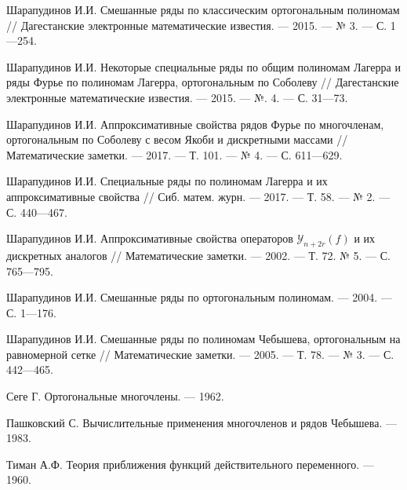 \begin{thebibliography}{99}
Шарапудинов И.И. Смешанные ряды по классическим ортогональным полиномам // Дагестанские электронные математические известия. --- 2015. --- № 3. --- С. 1---254.





Шарапудинов И.И. Некоторые специальные ряды по общим полиномам Лагерра и ряды Фурье по полиномам Лагерра, ортогональным по Соболеву // Дагестанские электронные математические известия. --- 2015. --- №. 4. --- С. 31---73.





Шарапудинов И.И. Аппроксимативные свойства рядов Фурье по многочленам, ортогональным по Соболеву с весом Якоби и дискретными массами // Математические заметки. --- 2017. --- Т. 101. --- № 4. --- С. 611---629.





Шарапудинов И.И. Специальные ряды по полиномам Лагерра и их аппроксимативные свойства // Сиб. матем. журн. --- 2017. --- Т. 58. --- № 2. --- С. 440---467.





Шарапудинов И.И. Аппроксимативные свойства операторов $\mathcal{Y}_{n+2r}(f)$ и их дискретных аналогов // Математические заметки. --- 2002. --- Т. 72. № 5. --- С. 765---795.





Шарапудинов И.И. Смешанные ряды по ортогональным полиномам. --- 2004. --- С. 1---176.





Шарапудинов И.И. Смешанные ряды по полиномам Чебышева, ортогональным на равномерной сетке // Математические заметки. --- 2005. --- Т. 78. --- № 3. --- С. 442---465.




Сеге Г. Ортогональные многочлены. --- 1962.





Пашковский С. Вычислительные применения многочленов и рядов Чебышева. --- 1983.





Тиман А.Ф. Теория приближения функций действительного переменного. --- 1960.






\end{thebibliography}
